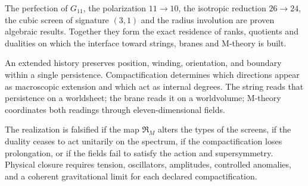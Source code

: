 \begin{resultado}
The perfection of \(G_{11}\), the polarization \(11\to10\), the isotropic
reduction \(26\to24\), the cubic screen of signature \((3,1)\) and the
radius involution are proven algebraic results. Together they form the
exact residence of ranks, quotients and dualities on which the interface
toward strings, branes and M-theory is built.
\end{resultado}

\begin{lecturafisica}
An extended history preserves position, winding, orientation, and
boundary within a single persistence. Compactification determines which
directions appear as macroscopic extension and which act as internal degrees.
The string reads that persistence on a worldsheet; the brane reads it on a
worldvolume; M-theory coordinates both readings through eleven-dimensional fields.
\end{lecturafisica}

\begin{frontera}
The realization is falsified if the map \(\mathfrak R_M\) alters the types of the screens, if the duality ceases to act unitarily on the spectrum, if the compactification loses prolongation, or if the fields fail to satisfy the action and supersymmetry. Physical closure requires tension, oscillators, amplitudes, controlled anomalies, and a coherent gravitational limit for each declared compactification.
\end{frontera}
